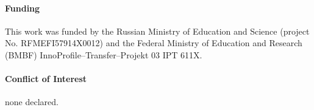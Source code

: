 \documentclass{bioinfo}
\begin{document}
\paragraph{Funding\textcolon} This work was funded by the Russian 
Ministry of Education and Science (project No. RFMEFI57914X0012) and the Federal 
Ministry of Education and Research (BMBF) InnoProfile--Transfer--Projekt 03 IPT 
611X.
	
\paragraph{Conflict of Interest\textcolon} none declared.

%
%
%
%
%
%

%

\end{document}
